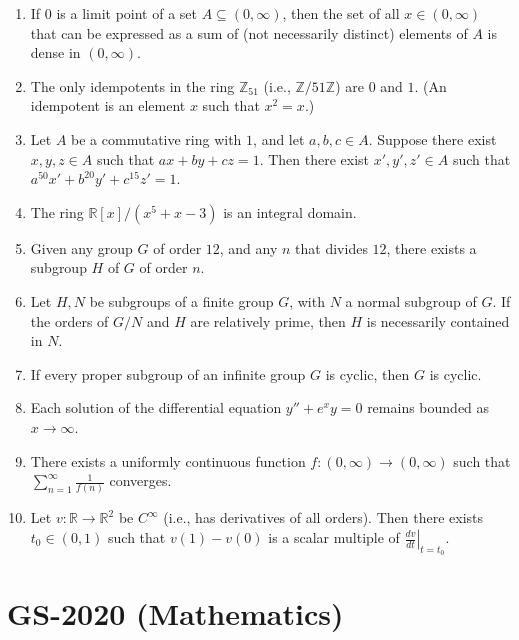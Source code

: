 \documentclass[11pt, a4paper]{article}
\begin{document}
\begin{enumerate}
  \item If $0$ is a limit point of a set $A \subseteq (0,\infty)$, then the set of all $x \in (0,\infty)$ that can be expressed as a sum of (not necessarily distinct) elements of $A$ is dense in $(0,\infty)$.
  \item The only idempotents in the ring $\mathbb{Z}_{51}$ (i.e., $\mathbb{Z}/51\mathbb{Z}$) are $0$ and $1$. (An idempotent is an element $x$ such that $x^2 = x$.)
  \item Let $A$ be a commutative ring with $1$, and let $a, b, c \in A$. Suppose there exist $x, y, z \in A$ such that $ax + by + cz = 1$. Then there exist $x', y', z' \in A$ such that $a^{50} x' + b^{20} y' + c^{15} z' = 1$.
  \item The ring $\mathbb{R}[x]/(x^5 + x - 3)$ is an integral domain.
  \item Given any group $G$ of order $12$, and any $n$ that divides $12$, there exists a subgroup $H$ of $G$ of order $n$.
  \item Let $H, N$ be subgroups of a finite group $G$, with $N$ a normal subgroup of $G$. If the orders of $G/N$ and $H$ are relatively prime, then $H$ is necessarily contained in $N$.
  \item If every proper subgroup of an infinite group $G$ is cyclic, then $G$ is cyclic.
  \item Each solution of the differential equation $y'' + e^x y = 0$ remains bounded as $x \to \infty$.
  \item There exists a uniformly continuous function $f: (0,\infty) \to (0,\infty)$ such that $\sum_{n=1}^\infty \frac{1}{f(n)}$ converges.
  \item Let $v: \mathbb{R} \to \mathbb{R}^2$ be $C^\infty$ (i.e., has derivatives of all orders). Then there exists $t_0 \in (0,1)$ such that $v(1) - v(0)$ is a scalar multiple of $\left.\frac{dv}{dt}\right|_{t=t_0}$.
\end{enumerate}

\newpage

\section{GS-2020 (Mathematics)}
\end{document}
